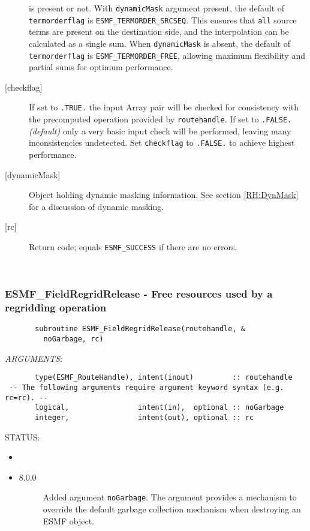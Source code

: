 \begin{description}
       is present or not. With {\tt dynamicMask} argument present, the default
       of {\tt termorderflag} is {\tt ESMF\_TERMORDER\_SRCSEQ}. This ensures
       that {\tt all} source terms are present on the destination side, and 
       the interpolation can be calculated as a single sum. When 
       {\tt dynamicMask} is absent, the default of {\tt termorderflag} is
       {\tt ESMF\_TERMORDER\_FREE}, allowing maximum flexibility and partial 
       sums for optimum performance.
     \item [{[checkflag]}]
       If set to {\tt .TRUE.} the input Array pair will be checked for
       consistency with the precomputed operation provided by {\tt routehandle}.
       If set to {\tt .FALSE.} {\em (default)} only a very basic input check
       will be performed, leaving many inconsistencies undetected. Set
       {\tt checkflag} to {\tt .FALSE.} to achieve highest performance.
     \item [{[dynamicMask]}]
       Object holding dynamic masking information.
       See section \ref{RH:DynMask} for a discussion of dynamic masking.
     \item [{[rc]}]
       Return code; equals {\tt ESMF\_SUCCESS} if there are no errors.
     \end{description} 
 
\mbox{}\hrulefill\ 
 
\subsubsection [ESMF\_FieldRegridRelease] {ESMF\_FieldRegridRelease - Free resources used by a regridding operation}


  
\begin{verbatim}       subroutine ESMF_FieldRegridRelease(routehandle, &
         noGarbage, rc)\end{verbatim}{\em ARGUMENTS:}
\begin{verbatim}       type(ESMF_RouteHandle), intent(inout)         :: routehandle
 -- The following arguments require argument keyword syntax (e.g. rc=rc). --
       logical,                intent(in),  optional :: noGarbage
       integer,                intent(out), optional :: rc \end{verbatim}
{\sf STATUS:}
   \begin{itemize}
   \item{}
   \item{}
   \begin{description}
   \item[8.0.0] Added argument {\tt noGarbage}.
     The argument provides a mechanism to override the default garbage collection
     mechanism when destroying an ESMF object.
   \end{description}
   \end{itemize}
  
